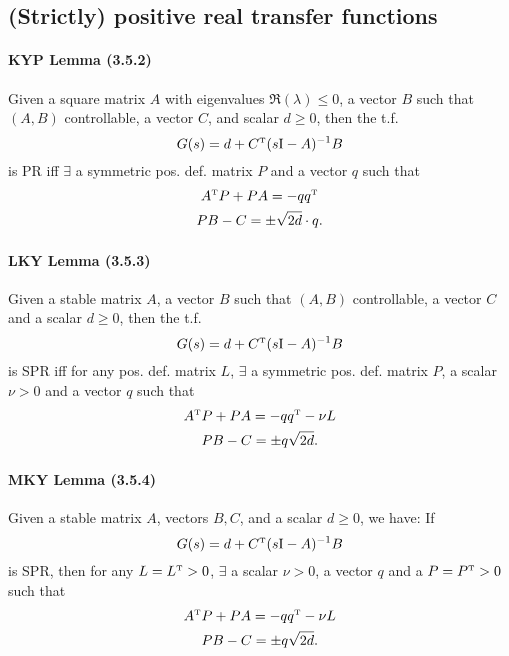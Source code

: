 \subsection{(Strictly) positive real transfer functions}

\paragraph{KYP Lemma (3.5.2)}
Given a square matrix $A$ with eigenvalues $\Re(\lambda) \leq 0$, a vector $B$ such that $(A,B)$ controllable, a vector $C$, and scalar $d \geq 0$, then the t.f.
\begin{equation}
	G(s) = d + C^{\scriptscriptstyle \mathrm{T}} (s \mathrm{I} - A)^{-1} B
\end{equation}
is PR iff $\exists$ a symmetric pos. def. matrix $P$ and a vector $q$ such that
\begin{gather}
	A^{\scriptscriptstyle \mathrm{T}} P + P A = -q q^{\scriptscriptstyle \mathrm{T}} \\
	P B - C = \pm \sqrt{2d} \cdot q
	.
\end{gather}

\paragraph{LKY Lemma (3.5.3)}
Given a stable matrix $A$, a vector $B$ such that $(A,B)$ controllable, a vector $C$ and a scalar $d \geq 0$, then the t.f.
\begin{equation}
	G(s) = d + C^{\scriptscriptstyle \mathrm{T}} (s \mathrm{I} - A)^{-1} B
\end{equation}
is SPR iff for any pos. def. matrix $L$, $\exists$ a symmetric pos. def. matrix $P$, a scalar $\nu > 0$ and a vector $q$ such that
\begin{gather}
	A^{\scriptscriptstyle \mathrm{T}} P + P A = -q q^{\scriptscriptstyle \mathrm{T}} - \nu L \\
	P B - C = \pm q \sqrt{2d}
	.
\end{gather}

\paragraph{MKY Lemma (3.5.4)}
Given a stable matrix $A$, vectors $B,C$, and a scalar $d \geq 0$, we have: If
\begin{equation}
	G(s) = d + C^{\scriptscriptstyle \mathrm{T}} (s \mathrm{I} - A)^{-1} B
\end{equation}
is SPR, then for any $L = L^{\scriptscriptstyle \mathrm{T}} > 0$, $\exists$ a scalar $\nu > 0$, a vector $q$ and a $P = P^{\scriptscriptstyle \mathrm{T}} > 0$ such that
\begin{gather}
	A^{\scriptscriptstyle \mathrm{T}} P + P A = -q q^{\scriptscriptstyle \mathrm{T}} - \nu L \\
	P B - C = \pm q \sqrt{2d}
	.
\end{gather}